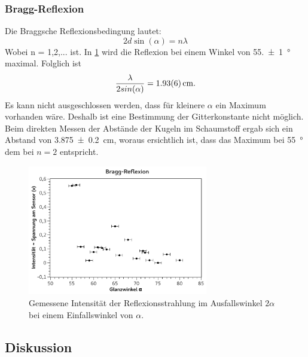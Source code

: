 \documentclass[
	a4paper,
	12pt,
	pagesize,
	ngerman
]{scrartcl}
\begin{document}
	\subsubsection{Bragg-Reflexion}
	Die Braggsche Reflexionsbedingung lautet:
	\begin{equation}
		2d \sin(\alpha) = n \lambda
	\end{equation}
	Wobei n = 1,2,... ist. %
	In \cref{fig_bragg} wird die Reflexion bei einem Winkel von \SI{55,+-1}{\degree} maximal. %
	Folglich ist 
	\begin{equation*}
		\frac{\lambda}{2sin(\alpha)} = \SI{1,93+-0,06}{cm}. %
	\end{equation*}
	Es kann nicht ausgeschlossen werden, dass für kleinere $\alpha$ ein Maximum vorhanden wäre.
	Deshalb ist eine Bestimmung der Gitterkonstante nicht möglich.
	Beim direkten Messen der Abstände der Kugeln im Schaumstoff ergab sich ein Abstand von \SI{3,875+-0,2}{cm}, woraus ersichtlich ist, dass das Maximum bei \SI{55}{\degree} dem bei $n=2$ entspricht. %
	\begin{figure}[H]
		\includegraphics[width=0.7\textwidth]{fig_bragg}
		\centering
		\caption{Gemessene Intensität der Reflexionsstrahlung im Ausfallswinkel $2\alpha$ bei einem Einfallswinkel von $\alpha$.}
		\label{fig_bragg}
		\centering
	\end{figure}
	\subsection{Diskussion}
	
\end{document}
